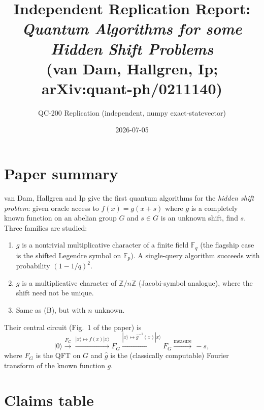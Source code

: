 \documentclass[11pt]{article}
\title{Independent Replication Report:\\
       \emph{Quantum Algorithms for some Hidden Shift Problems}\\
       (van Dam, Hallgren, Ip; arXiv:quant-ph/0211140)}
\author{QC-200 Replication (independent, numpy exact-statevector)}
\date{2026-07-05}
\begin{document}
\maketitle

\section{Paper summary}

van Dam, Hallgren and Ip \cite{vDHI02} give the first quantum algorithms
for the \emph{hidden shift problem}: given oracle access to
$f(x) = g(x + s)$ where $g$ is a completely known function on an abelian
group $G$ and $s \in G$ is an unknown shift, find $s$.  Three families are
studied:

\begin{enumerate}
  \item[(A)] $g$ is a nontrivial multiplicative character of a finite
        field $\mathbb{F}_q$ (the flagship case is the shifted Legendre
        symbol on $\mathbb{F}_p$).  A single-query algorithm succeeds
        with probability $(1-1/q)^2$.
  \item[(B)] $g$ is a multiplicative character of $\mathbb{Z}/n\mathbb{Z}$
        (Jacobi-symbol analogue), where the shift need not be unique.
  \item[(C)] Same as (B), but with $n$ unknown.
\end{enumerate}

Their central circuit (Fig.~1 of the paper) is
\[
  |0\rangle \xrightarrow{F_G} \xrightarrow{|x\rangle \mapsto f(x)|x\rangle}
  F_G \xrightarrow{|x\rangle \mapsto \hat g^{-1}(x)|x\rangle} F_G
  \xrightarrow{\text{measure}} \, -s,
\]
where $F_G$ is the QFT on $G$ and $\hat g$ is the (classically
computable) Fourier transform of the known function $g$.

\section{Claims table}
\end{document}
